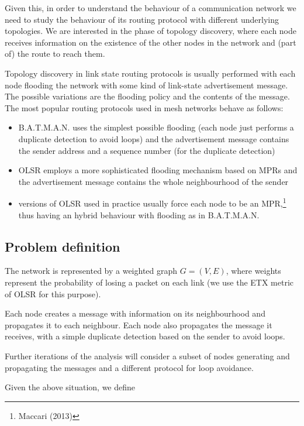 \documentclass[oneside,openany]{memoir}
\begin{document}
Given this, in order to understand the behaviour of a communication
network we need to study the behaviour of its routing protocol with
different underlying topologies. We are interested in the phase of
topology discovery, where each node receives information on the
existence of the other nodes in the network and (part of) the route to
reach them.

Topology discovery in link state routing protocols is usually performed
with each node flooding the network with some kind of link-state
advertisement message. The possible variations are the flooding policy
and the contents of the message. The most popular routing protocols used
in mesh networks behave as follows:

\begin{itemize}
\itemsep1pt\parskip0pt
\item
  B.A.T.M.A.N. uses the simplest possible flooding (each node just
  performs a duplicate detection to avoid loops) and the advertisement
  message contains the sender address and a sequence number (for the
  duplicate detection)
\item
  OLSR employs a more sophisticated flooding mechanism based on MPRs and
  the advertisement message contains the whole neighbourhood of the
  sender
\item
  versions of OLSR used in practice usually force each node to be an
  MPR,\footnote{Maccari (2013)} thus having an hybrid behaviour with
  flooding as in B.A.T.M.A.N.
\end{itemize}

\subsection{Problem definition}\label{problem-definition}

The network is represented by a weighted graph $G=(V,E)$, where weights
represent the probability of losing a packet on each link (we use the
ETX metric of OLSR for this purpose).

Each node creates a message with information on its neighbourhood and
propagates it to each neighbour. Each node also propagates the message
it receives, with a simple duplicate detection based on the sender to
avoid loops.

Further iterations of the analysis will consider a subset of nodes
generating and propagating the messages and a different protocol for
loop avoidance.

Given the above situation, we define
\end{document}
